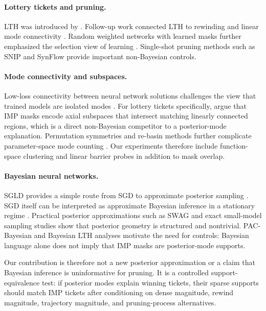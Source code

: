 \documentclass{article}
\begin{document}
\paragraph{Lottery tickets and pruning.}
LTH was introduced by \citet{frankle2019lottery}. Follow-up work connected LTH
to rewinding and linear mode connectivity \citep{frankle2020linear}. Random
weighted networks with learned masks further emphasized the selection view of
learning \citep{ramanujan2020hidden}. Single-shot pruning methods such as SNIP
\citep{lee2019snip} and SynFlow \citep{tanaka2020synflow} provide important
non-Bayesian controls.

\paragraph{Mode connectivity and subspaces.}
Low-loss connectivity between neural network solutions challenges the view that
trained models are isolated modes \citep{garipov2018loss, draxler2018barriers}.
For lottery tickets specifically, \citet{paul2023unmasking} argue that IMP
masks encode axial subspaces that intersect matching linearly connected regions,
which is a direct non-Bayesian competitor to a posterior-mode explanation.
Permutation symmetries and re-basin methods further complicate parameter-space
mode counting \citep{entezari2022role, ainsworth2023git}. Our experiments
therefore include function-space clustering and linear barrier probes in
addition to mask overlap.

\paragraph{Bayesian neural networks.}
SGLD provides a simple route from SGD to approximate posterior sampling
\citep{welling2011sgld}. SGD itself can be interpreted as approximate Bayesian
inference in a stationary regime \citep{mandt2017sgd}. Practical posterior
approximations such as SWAG \citep{maddox2019swag} and exact small-model
sampling studies \citep{izmailov2021posteriors} show that posterior geometry is
structured and nontrivial. PAC-Bayesian and Bayesian LTH analyses
\citep{sakamoto2022pacbayes, kuhn2026bayesian} motivate the need for controls:
Bayesian language alone does not imply that IMP masks are posterior-mode
supports.

Our contribution is therefore not a new posterior approximation or a claim that
Bayesian inference is uninformative for pruning. It is a controlled
support-equivalence test: if posterior modes explain winning tickets, their
sparse supports should match IMP tickets after conditioning on dense magnitude,
rewind magnitude, trajectory magnitude, and pruning-process alternatives.
\end{document}
